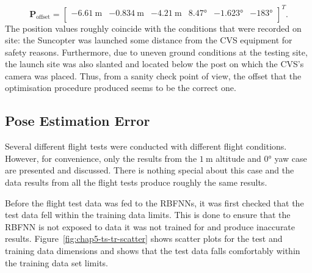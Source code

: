 \begin{equation}
  \label{eq:chap5-offset-result}
  \bm{P}_{\mathrm{offset}} = 
  \begin{bmatrix}
    \SI{-6.61}{\m} & \SI{-0.834}{\m} & \SI{-4.21}{\m} & \ang{8.47} & \ang{-1.623} & \ang{-183} \\
  \end{bmatrix}^T.
\end{equation}
The position values roughly coincide with the conditions that were recorded on site: the Suncopter was launched some distance from the CVS equipment for safety reasons. Furthermore, due to uneven ground conditions at the testing site, the launch site was also slanted and located below the post on which the CVS's camera was placed. Thus, from a sanity check point of view, the offset that the optimisation procedure produced seems to be the correct one. 

\subsection{Pose Estimation Error}

Several different flight tests were conducted with different flight conditions. However, for convenience, only the results from the $\SI{1}{\m}$ altitude and $\ang{0}$ yaw case are presented and discussed. There is nothing special about this case and the data results from all the flight tests produce roughly the same results.  

Before the flight test data was fed to the RBFNNs, it was first checked that the test data fell within the training data limits. This is done to ensure that the RBFNN is not exposed to data it was not trained for and produce inaccurate results. Figure~\ref{fig:chap5-ts-tr-scatter} shows scatter plots for the test and training data dimensions and shows that the test data falls comfortably within the training data set limits.  

